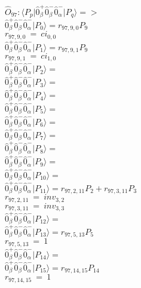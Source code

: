 \documentclass[14pt]{article}
\begin{document}
    $\hat{O}_{97}:  \langle{P_p}\vert \hat{0}_{\beta}^{+}\hat{0}_{\beta}^{-}\hat{0}_{\alpha}^{-} \vert{P_q}\rangle => $ \\ 
    $ \hat{0}_{\beta}^{+}\hat{0}_{\beta}^{-}\hat{0}_{\alpha}^{-} \vert{P_{0}}\rangle = {r}_{97,9,0}P_{9} $ \\ 
    ${r}_{97,9,0}\ =\ {ci}_{0,0} $ \\ 
    $ \hat{0}_{\beta}^{+}\hat{0}_{\beta}^{-}\hat{0}_{\alpha}^{-} \vert{P_{1}}\rangle = {r}_{97,9,1}P_{9} $ \\ 
    ${r}_{97,9,1}\ =\ {ci}_{1,0} $ \\ 
    $ \hat{0}_{\beta}^{+}\hat{0}_{\beta}^{-}\hat{0}_{\alpha}^{-} \vert{P_{2}}\rangle =  $ \\ 
    $ \hat{0}_{\beta}^{+}\hat{0}_{\beta}^{-}\hat{0}_{\alpha}^{-} \vert{P_{3}}\rangle =  $ \\ 
    $ \hat{0}_{\beta}^{+}\hat{0}_{\beta}^{-}\hat{0}_{\alpha}^{-} \vert{P_{4}}\rangle =  $ \\ 
    $ \hat{0}_{\beta}^{+}\hat{0}_{\beta}^{-}\hat{0}_{\alpha}^{-} \vert{P_{5}}\rangle =  $ \\ 
    $ \hat{0}_{\beta}^{+}\hat{0}_{\beta}^{-}\hat{0}_{\alpha}^{-} \vert{P_{6}}\rangle =  $ \\ 
    $ \hat{0}_{\beta}^{+}\hat{0}_{\beta}^{-}\hat{0}_{\alpha}^{-} \vert{P_{7}}\rangle =  $ \\ 
    $ \hat{0}_{\beta}^{+}\hat{0}_{\beta}^{-}\hat{0}_{\alpha}^{-} \vert{P_{8}}\rangle =  $ \\ 
    $ \hat{0}_{\beta}^{+}\hat{0}_{\beta}^{-}\hat{0}_{\alpha}^{-} \vert{P_{9}}\rangle =  $ \\ 
    $ \hat{0}_{\beta}^{+}\hat{0}_{\beta}^{-}\hat{0}_{\alpha}^{-} \vert{P_{10}}\rangle =  $ \\ 
    $ \hat{0}_{\beta}^{+}\hat{0}_{\beta}^{-}\hat{0}_{\alpha}^{-} \vert{P_{11}}\rangle = {r}_{97,2,11}P_{2}+{r}_{97,3,11}P_{3} $ \\ 
    ${r}_{97,2,11}\ =\ {inv}_{3,2} $ \\ 
    ${r}_{97,3,11}\ =\ {inv}_{3,3} $ \\ 
    $ \hat{0}_{\beta}^{+}\hat{0}_{\beta}^{-}\hat{0}_{\alpha}^{-} \vert{P_{12}}\rangle =  $ \\ 
    $ \hat{0}_{\beta}^{+}\hat{0}_{\beta}^{-}\hat{0}_{\alpha}^{-} \vert{P_{13}}\rangle = {r}_{97,5,13}P_{5} $ \\ 
    ${r}_{97,5,13}\ =\ 1 $ \\ 
    $ \hat{0}_{\beta}^{+}\hat{0}_{\beta}^{-}\hat{0}_{\alpha}^{-} \vert{P_{14}}\rangle =  $ \\ 
    $ \hat{0}_{\beta}^{+}\hat{0}_{\beta}^{-}\hat{0}_{\alpha}^{-} \vert{P_{15}}\rangle = {r}_{97,14,15}P_{14} $ \\ 
    ${r}_{97,14,15}\ =\ 1 $ \\ 
    
\end{document}
